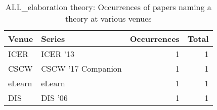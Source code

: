 \begin{table*}[t]
\begin{tabular}{llrr}
Venue & Series & Occurrences & Total\\\hline
\multirow{1}{*}{ICER } & ICER '13 & 1 & \multirow{1}{*}{1}\\
\multirow{1}{*}{CSCW } & CSCW '17 Companion & 1 & \multirow{1}{*}{1}\\
\multirow{1}{*}{eLearn} & eLearn & 1 & \multirow{1}{*}{1}\\
\multirow{1}{*}{DIS } & DIS '06 & 1 & \multirow{1}{*}{1}\\
\end{tabular}
\caption{ALL\_elaboration theory: Occurrences of papers naming a theory at various venues}
\end{table*}